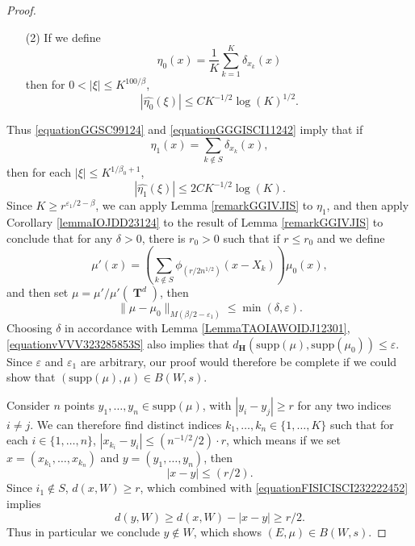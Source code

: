 \documentclass[dvipsnames,letterpaper,12pt]{article}
\numberwithin{equation}{section}
\DeclareMathOperator{\TT}{\mathbf{T}}
\numberwithin{theorem}{section}
\begin{document}
\begin{proof}
\begin{itemize}
        \item[(2)] If we define
        \[ \eta_0(x) = \frac{1}{K} \sum_{k = 1}^K \delta_{x_k}(x) \]
        then for $0 < |\xi| \leq K^{100/\beta}$,
        \begin{equation} \label{equationGGGISCI11242}
            |\widehat{\eta_0}(\xi)| \leq C K^{-1/2} \log(K)^{1/2}.
        \end{equation}
    \end{itemize}
    Thus \eqref{equationGGSC99124} and \eqref{equationGGGISCI11242} imply that if
    \[ \eta_1(x) = \sum_{k \not \in S} \delta_{x_k}(x), \]
    then for each $|\xi| \leq K^{1/\beta_0 + 1}$,
    \begin{equation} \label{equationGGSCSIAXAXXXSFGG}
        |\widehat{\eta_1}(\xi)| \leq 2C K^{-1/2} \log(K).
    \end{equation}
    Since $K \geq r^{\varepsilon_1/2 - \beta}$, we can apply Lemma \ref{remarkGGIVJIS} to $\eta_1$, and then apply Corollary \ref{lemmaIOJDD23124} to the result of Lemma \ref{remarkGGIVJIS} to conclude that for any $\delta > 0$, there is $r_0 > 0$ %
    such that if $r \leq r_0$ and we define
    \[ \mu'(x) = \left( \sum_{k \not \in S} \phi_{(r/2n^{1/2})}(x - X_k) \right) \mu_0(x), \]
    and then set $\mu = \mu' / \mu'(\TT^d)$, then
    \begin{equation} \label{equationvVVV323285853S}
        \| \mu - \mu_0 \|_{M(\beta/2 - \varepsilon_1)} \leq \min(\delta,\varepsilon).
    \end{equation}
    Choosing $\delta$ in accordance with Lemma \ref{LemmaTAOIAWOIDJ12301}, \eqref{equationvVVV323285853S} also implies that $d_\mathbf{H}(\text{supp}(\mu), \text{supp}(\mu_0)) \leq \varepsilon$. Since $\varepsilon$ and $\varepsilon_1$ are arbitrary, our proof would therefore be complete if we could show that $(\text{supp}(\mu),\mu) \in B(W,s)$.

    Consider $n$ points $y_1, \dots, y_n \in \text{supp}(\mu)$, with $|y_i - y_j| \geq r$ for any two indices $i \neq j$. We can therefore find distinct indices $k_1, \dots, k_n \in \{ 1, \dots, K \}$ such that for each $i \in \{ 1, \dots, n \}$, $|x_{k_i} - y_i| \leq (n^{-1/2}/2) \cdot r$, which means if we set $x = (x_{k_1}, \dots, x_{k_n})$ and $y = (y_1, \dots, y_n)$, then
    \begin{equation} \label{equationFISICISCI232222452}
        |x - y| \leq (r/2).
    \end{equation}
    Since $i_1 \not \in S$, $d(x,W) \geq r$, which combined with \eqref{equationFISICISCI232222452} implies
    \begin{equation} \label{equationSICSICI}
        d(y,W) \geq d(x,W) - |x - y| \geq r/2.
    \end{equation}
    Thus in particular we conclude $y \not \in W$, which shows $(E,\mu) \in B(W,s)$.
\end{proof}
\end{document}
